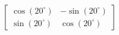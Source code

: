 \documentclass[preview]{standalone}
\begin{document}
\begin{align*}
\begin{bmatrix} \cos(20^\circ) & -\sin(20^\circ) \\ \sin(20^\circ) & \cos(20^\circ) \end{bmatrix}
\end{align*}
\end{document}
